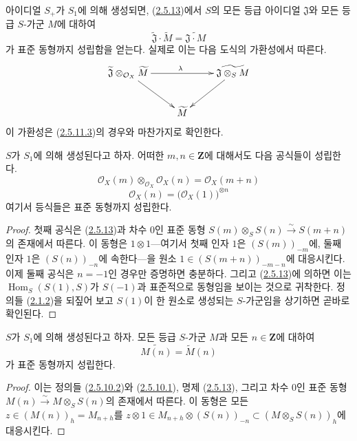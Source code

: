 아이디얼 $S_+$가 $S_1$에 의해 생성되면,
(\hyperref[II.2.5.13-ko]{2.5.13})에서 $S$의 모든 등급 아이디얼
$\mathfrak{J}$와 모든 등급 $S$-가군 $M$에 대하여
\[
\label{II.2.5.13.1-ko}
  \widetilde{\mathfrak{J}}\cdot\widetilde{M}
  =\widetilde{\mathfrak{J}\cdot M}
\tag{2.5.13.1}
\]
가 표준 동형까지 성립함을 얻는다. 실제로 이는 다음 도식의 가환성에서
따른다.
\[
  \xymatrix{
    \widetilde{\mathfrak{J}}\otimes_{\mathcal{O}_X}\widetilde{M}
    \ar[rr]^\lambda\ar[dr]
    && \widetilde{\mathfrak{J}\otimes_S M}\ar[dl]\\
    & \widetilde{M} &
  }
\]
이 가환성은 (\hyperref[II.2.5.11.3-ko]{2.5.11.3})의 경우와 마찬가지로
확인한다.

\begin{corollary}[2.5.14]
\label{II.2.5.14-ko}
$S$가 $S_1$에 의해 생성된다고 하자. 어떠한 $m,n\in\mathbf{Z}$에
대해서도 다음 공식들이 성립한다.
\[
\label{II.2.5.14.1-ko}
  \mathcal{O}_X(m)\otimes_{\mathcal{O}_X}\mathcal{O}_X(n)
  =\mathcal{O}_X(m+n)
\tag{2.5.14.1}
\]
\[
\label{II.2.5.14.2-ko}
  \mathcal{O}_X(n)=\bigl(\mathcal{O}_X(1)\bigr)^{\otimes n}
\tag{2.5.14.2}
\]
여기서 등식들은 표준 동형까지 성립한다.
\end{corollary}

\begin{proof}
첫째 공식은 (\hyperref[II.2.5.13-ko]{2.5.13})과 차수 $0$인 표준 동형
$S(m)\otimes_S S(n)\xrightarrow{\sim}S(m+n)$의 존재에서 따른다. 이 동형은
$1\otimes1$---여기서 첫째 인자 $1$은 $(S(m))_{-m}$에, 둘째 인자 $1$은
$(S(n))_{-n}$에 속한다---을 원소 $1\in(S(m+n))_{-m-n}$에 대응시킨다.
이제 둘째 공식은 $n=-1$인 경우만 증명하면 충분하다. 그리고
(\hyperref[II.2.5.13-ko]{2.5.13})에 의하면 이는
$\operatorname{Hom}_S(S(1),S)$가 $S(-1)$과 표준적으로 동형임을 보이는
것으로 귀착한다. 정의들 (\hyperref[II.2.1.2-ko]{2.1.2})을 되짚어 보고
$S(1)$이 한 원소로 생성되는 $S$-가군임을 상기하면 곧바로 확인된다.
\end{proof}

\begin{corollary}[2.5.15]
\label{II.2.5.15-ko}
$S$가 $S_1$에 의해 생성된다고 하자. 모든 등급 $S$-가군 $M$과 모든
$n\in\mathbf{Z}$에 대하여
\[
\label{II.2.5.15.1-ko}
  \widetilde{M(n)}=\widetilde{M}(n)
\tag{2.5.15.1}
\]
가 표준 동형까지 성립한다.
\end{corollary}

\begin{proof}
이는 정의들 (\hyperref[II.2.5.10.2-ko]{2.5.10.2})와
(\hyperref[II.2.5.10.1-ko]{2.5.10.1}), 명제
(\hyperref[II.2.5.13-ko]{2.5.13}), 그리고 차수 $0$인 표준 동형
$M(n)\xrightarrow{\sim}M\otimes_S S(n)$의 존재에서 따른다. 이 동형은 모든
$z\in(M(n))_h=M_{n+h}$를
$z\otimes1\in M_{n+h}\otimes(S(n))_{-n}\subset(M\otimes_S S(n))_h$에
대응시킨다.
\end{proof}

